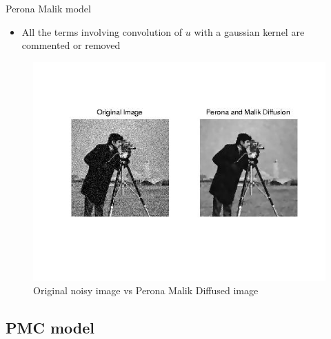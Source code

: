 \documentclass{beamer}
\begin{document}
\begin{frame}{Perona Malik model}
    \begin{itemize}
    \item {All the terms involving convolution of $u$ with a gaussian kernel are commented or removed }
    \end{itemize}
\begin{figure}
\caption{Original noisy image vs Perona Malik Diffused image}
\includegraphics[scale=0.5]{pm.jpg}
\end{figure}
\end{frame}

\subsection{PMC model}
\end{document}

